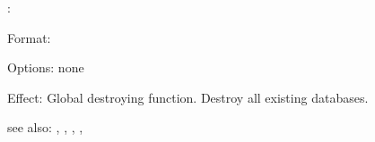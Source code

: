 \destroy:

Format: 

Options: none

Effect: Global destroying function.
        Destroy all existing \COLAB{} databases.

see also: \consult, , , , \replace

